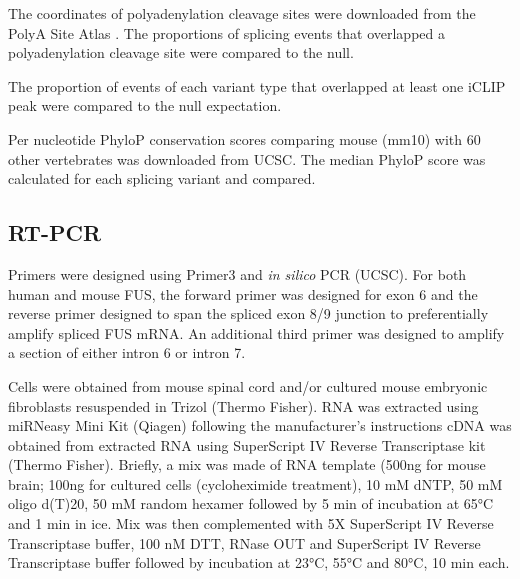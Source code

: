 The coordinates of polyadenylation cleavage sites were downloaded from the PolyA Site Atlas \citep{Gruber2016}. 
The proportions of  splicing events that overlapped a polyadenylation cleavage site were compared to the null.

The proportion of events of each variant type that overlapped at least one iCLIP peak  were compared to the null expectation.

Per nucleotide PhyloP conservation scores \citep{Pollard2010-fj} comparing mouse (mm10) with 60 other vertebrates was downloaded from UCSC. 
The median PhyloP score was calculated for each splicing variant and compared.

\subsection{RT-PCR}
Primers were designed using Primer3 \citep{Koressaar2007} and \textit{in silico} PCR (UCSC). 
For both human and mouse FUS, the forward primer was designed for exon 6 and the reverse primer designed to span the spliced exon 8/9 junction to preferentially amplify spliced FUS mRNA. 
An additional third primer was designed to amplify a section of either intron 6 or intron 7.

Cells were obtained from mouse spinal cord and/or cultured mouse embryonic fibroblasts resuspended in Trizol (Thermo Fisher). 
RNA was extracted using miRNeasy Mini Kit (Qiagen) following the manufacturer's instructions %
cDNA was obtained from extracted RNA using SuperScript IV Reverse Transcriptase kit (Thermo Fisher). 
Briefly, a mix was made of RNA template (500ng for mouse brain; 100ng for cultured cells (cycloheximide treatment), 10 mM dNTP, 50 mM oligo d(T)20, 50 mM random hexamer followed by 5 min of incubation at 65\si{\degree}C and 1 min in ice. Mix was then complemented with 5X SuperScript IV Reverse Transcriptase buffer, 100 nM DTT, RNase OUT and SuperScript IV Reverse Transcriptase buffer followed by incubation at 23\si{\degree}C, 55\si{\degree}C and 80\si{\degree}C, 10 min each. 

